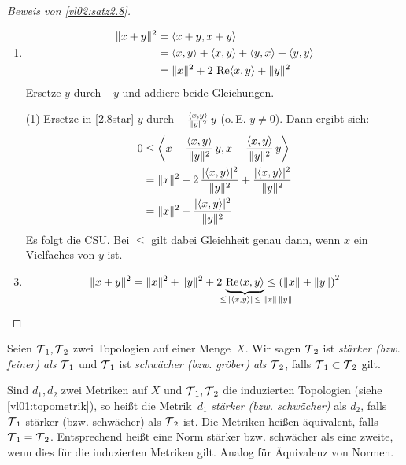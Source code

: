 \begin{proof}[Beweis von \cref{vl02:satz2.8}]\hfill
    \begin{enumerate}[(3)]
        \item
            \begin{align*}
                \norm{x+y}^2 
                &= \SP{x+y,x+y} 
                \\
                &= \SP{x,y} + \SP{x,y} + \SP{y,x} + \SP{y,y}
                \\
                &= \norm{x}^2 + 2\,\Re\SP{x,y} + \norm{y}^2
            \end{align*}
            Ersetze $y$ durch $-y$ und addiere beide Gleichungen.
            
        \item[(1)]
            Ersetze in \eqref{2.8star} $y$ durch
            $-\frac{\left\langle x,y\right\rangle}{\lVert y\rVert^2}\,y$ (o.\,E. $y\neq 0$). Dann ergibt
            sich:
            \begin{align*}
                0
                &\leq \left\langle
                    x-\frac{\left\langle x,y\right\rangle}{\lVert y\rVert^2}\,y, x - \frac{\left\langle x,y\right\rangle}{\lVert y\rVert^2}\,y 
                \right\rangle
                \\
                &= \lVert x\rVert^2 - 2\,\frac{\lvert\left\langle x,y\right\rangle\rvert^2}{\lVert y\rVert^2} +
                \frac{\lvert\left\langle x,y\right\rangle\rvert^2}{\lVert y\rVert^2}
                \\
                &= \lVert x\rVert^2 - \frac{\lvert\left\langle x,y\right\rangle\rvert^2}{\lVert y\rVert^2}
            \end{align*}
            Es folgt die CSU. Bei $\leq$ gilt dabei Gleichheit genau dann, wenn
            $x$ ein Vielfaches von $y$ ist.
            
        \item
            \[
                \norm{x+y}^2 = \norm{x}^2 + \norm{y}^2 + 
                2\,\underbrace{\Re\SP{x,y}}_{\smash{\mathclap{\qquad\leq\, \abs{\SP{x,y}}
                \,\leq\, \norm x\,\norm y}}}
                \leq \left( \norm x + \norm y \right)^2
            \]
    \end{enumerate}
\end{proof}

\begin{thEmpty}
    Seien $\operatorname{\mathcal{T}}_1,\operatorname{\mathcal{T}}_2$ zwei Topologien auf einer Menge~$X$. Wir sagen
    $\operatorname{\mathcal{T}}_2$ ist \emph{stärker (bzw. feiner) als $\operatorname{\mathcal{T}}_1$} und $\operatorname{\mathcal{T}}_1$ ist
    \emph{schwächer (bzw. gröber) als $\operatorname{\mathcal{T}}_2$}, falls
    $\operatorname{\mathcal{T}}_1\subset\operatorname{\mathcal{T}}_2$ gilt.
    
    Sind $d_1,d_2$ zwei Metriken auf $X$ und $\operatorname{\mathcal{T}}_1,\operatorname{\mathcal{T}}_2$ die induzierten
    Topologien (siehe \cref{vl01:topometrik}),
    so heißt die Metrik~$d_1$ \emph{stärker (bzw. schwächer)} als $d_2$, falls
    $\operatorname{\mathcal{T}}_1$ stärker (bzw. schwächer) als $\operatorname{\mathcal{T}}_2$ ist. Die Metriken heißen
    äquivalent, falls $\operatorname{\mathcal{T}}_1=\operatorname{\mathcal{T}}_2$. Entsprechend heißt eine Norm stärker
    bzw. schwächer als eine zweite, wenn dies für die induzierten Metriken gilt.
    Analog für Äquivalenz von Normen.
\end{thEmpty}

